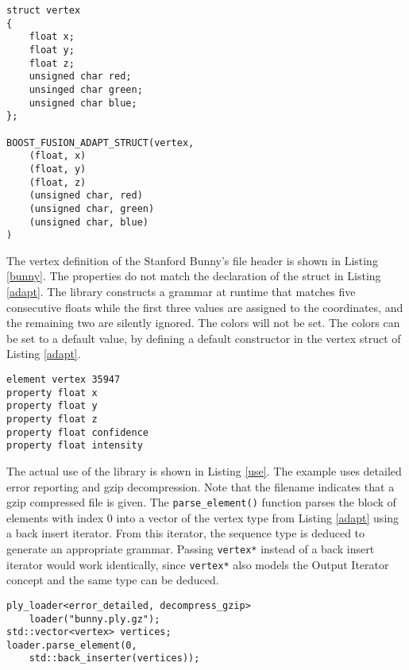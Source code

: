 \begin{lstlisting}[label=adapt,frame=tb,caption=Adapting a vertex struct]
struct vertex
{
	float x;
	float y;
	float z;
	unsigned char red;
	unsinged char green;
	unsigned char blue;
};

BOOST_FUSION_ADAPT_STRUCT(vertex,
	(float, x)
	(float, y)
	(float, z)
	(unsigned char, red)
	(unsigned char, green)
	(unsigned char, blue)
)
\end{lstlisting}

The vertex definition of the Stanford Bunny's file header is shown in Listing
\ref{bunny}. The properties do not match the declaration of the struct in
Listing \ref{adapt}. The library constructs a grammar at runtime that matches
five consecutive floats while the first three values are assigned to the
coordinates, and the remaining two are silently ignored. The colors will not be
set. The colors can be set to a default value, by defining a default constructor
in the vertex struct of Listing \ref{adapt}.

\begin{lstlisting}[label=bunny, frame=tb,
  caption=Stanford Bunny's definition of the vertex element]
element vertex 35947
property float x
property float y
property float z
property float confidence
property float intensity
\end{lstlisting}

The actual use of the library is shown in Listing \ref{use}. The example uses
detailed error reporting and gzip decompression. Note that the filename
indicates that a gzip compressed file is given. The \texttt{parse\_element()}
function parses the block of elements with index 0 into a vector of the vertex
type from Listing \ref{adapt} using a back insert iterator. From this iterator,
the sequence type is deduced to generate an appropriate grammar. Passing
\texttt{vertex*} instead of a back insert iterator would work identically, since
\texttt{vertex*} also models the Output Iterator concept and the same type can
be deduced.

\begin{lstlisting}[label=use, frame=tb, caption=Example use of the library]
ply_loader<error_detailed, decompress_gzip>
	loader("bunny.ply.gz");
std::vector<vertex> vertices;
loader.parse_element(0,
	std::back_inserter(vertices));
\end{lstlisting}

